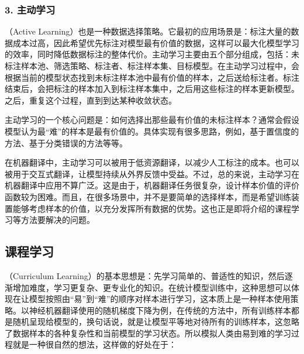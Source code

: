 
\subsubsection{3. 主动学习}

（Active Learning）也是一种数据选择策略。它最初的应用场景是：标注大量的数据成本过高，因此希望优先标注对模型最有价值的数据，这样可以最大化模型学习的效率，同时降低数据标注的整体代价。主动学习主要由五个部分组成，包括：未标注样本池、筛选策略、标注者、标注样本集、目标模型。在主动学习过程中，会根据当前的模型状态找到未标注样本池中最有价值的样本，之后送给标注者。标注结束后，会把标注的样本加入到标注样本集中，之后用这些标注的样本更新模型。之后，重复这个过程，直到到达某种收敛状态。

\parinterval 主动学习的一个核心问题是：如何选择出那些最有价值的未标注样本？通常会假设模型认为最“难”的样本是最有价值的。具体实现有很多思路，例如，基于置信度的方法、基于分类错误的方法等等。

\parinterval 在机器翻译中，主动学习可以被用于低资源翻译，以减少人工标注的成本。也可以被用于交互式翻译，让模型持续从外界反馈中受益。不过，总的来说，主动学习在机器翻译中应用不算广泛。这是由于，机器翻译任务很复杂，设计样本价值的评价函数较为困难。而且，在很多场景中，并不是要简单的选择样本，而是希望训练装置能够考虑样本的价值，以充分发挥所有数据的优势。这也正是即将介绍的课程学习等方法要解决的问题。


\subsection{课程学习}
\label{sec:curriculum-learning}

（Curriculum Learning）的基本思想是：先学习简单的、普适性的知识，然后逐渐增加难度，学习更复杂、更专业化的知识。在统计模型训练中，这种思想可以体现在让模型按照由“易”到“难”的顺序对样本进行学习，这本质上是一种样本使用策略。以神经机器翻译使用的随机梯度下降为例，在传统的方法中，所有训练样本都是随机呈现给模型的，换句话说，就是让模型平等地对待所有的训练样本，这忽略了数据样本的各种复杂性和当前模型的学习状态。所以模拟人类由易到难的学习过程就是一种很自然的想法，这样做的好处在于：

